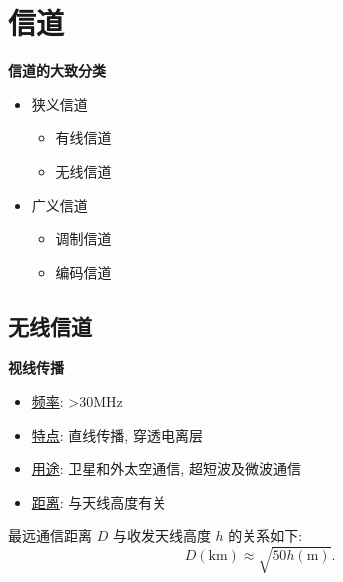 \section{信道}
\textbf{信道的大致分类}
\begin{itemize}
    \item 狭义信道
          \begin{itemize}
              \item 有线信道
              \item 无线信道
          \end{itemize}
    \item 广义信道
          \begin{itemize}
              \item 调制信道
              \item 编码信道
          \end{itemize}
\end{itemize}

\subsection{无线信道}
\textbf{视线传播}
\begin{itemize}
    \item \underline{频率}: >30MHz
    \item \underline{特点}: 直线传播, 穿透电离层
    \item \underline{用途}: 卫星和外太空通信, 超短波及微波通信
    \item \underline{距离}: 与天线高度有关
\end{itemize}

最远通信距离 $D$ 与收发天线高度 $h$ 的关系如下:
\begin{equation}
    D (\text{km})\approx\sqrt{50h (\text{m})}.
\end{equation}
